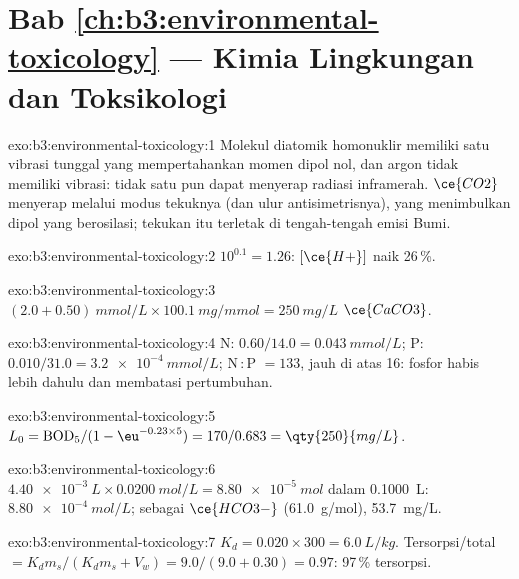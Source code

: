 \section*{Bab \ref{ch:b3:environmental-toxicology} --- Kimia Lingkungan dan Toksikologi}

\begin{solution}{exo:b3:environmental-toxicology:1}
Molekul diatomik homonuklir memiliki satu vibrasi tunggal yang mempertahankan momen dipol nol,
dan argon tidak memiliki vibrasi: tidak satu pun dapat menyerap radiasi inframerah. $\ce{CO2}$ menyerap melalui
modus tekuknya (dan ulur antisimetrisnya), yang menimbulkan dipol yang
berosilasi; tekukan itu terletak di tengah-tengah emisi Bumi.
\end{solution}

\begin{solution}{exo:b3:environmental-toxicology:2}
$10^{0.1} = 1.26$: $[\ce{H+}]$ naik 26\,\%.
\end{solution}

\begin{solution}{exo:b3:environmental-toxicology:3}
$(2.0 + 0.50)\ \unit{mmol/L} \times \qty{100.1}{mg/mmol} = \qty{250}{mg/L}$ $\ce{CaCO3}$.
\end{solution}

\begin{solution}{exo:b3:environmental-toxicology:4}
N: $0.60/14.0 = \qty{0.043}{mmol/L}$; P: $0.010/31.0 = \qty{3.2e-4}{mmol/L}$; N\,:\,P $= 133$, jauh di atas 16: fosfor habis
lebih dahulu dan membatasi pertumbuhan.
\end{solution}

\begin{solution}{exo:b3:environmental-toxicology:5}
$L_0 = \mathrm{BOD_5}/(1 - \eu^{-0.23 \times 5}) = 170/0.683 = \qty{250}{mg/L}$.
\end{solution}

\begin{solution}{exo:b3:environmental-toxicology:6}
$\qty{4.40e-3}{L} \times \qty{0.0200}{mol/L} = \qty{8.80e-5}{mol}$ dalam \qty{0.1000}{L}:  $\qty{8.80e-4}{mol/L}$; sebagai $\ce{HCO3-}$ (\qty{61.0}{g/mol}),
\qty{53.7}{mg/L}.
\end{solution}

\begin{solution}{exo:b3:environmental-toxicology:7}
$K_d = 0.020 \times 300 = \qty{6.0}{L/kg}$. Tersorpsi/total $= K_dm_s/(K_dm_s + V_w) = 9.0/(9.0 + 0.30) = 0.97$: 97\,\% tersorpsi.
\end{solution}

